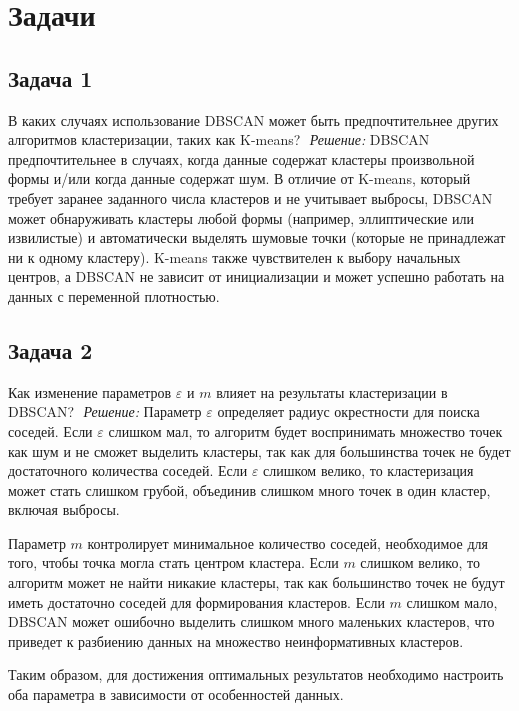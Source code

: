 \section*{Задачи}
\subsection*{Задача 1}
В каких случаях использование DBSCAN может быть предпочтительнее других алгоритмов кластеризации, таких как K-means?
\newline $ $ \newline
\textit{Решение:} DBSCAN предпочтительнее в случаях, когда данные содержат кластеры произвольной формы и/или когда данные содержат шум. В отличие от K-means, который требует заранее заданного числа кластеров и не учитывает выбросы, DBSCAN может обнаруживать кластеры любой формы (например, эллиптические или извилистые) и автоматически выделять шумовые точки (которые не принадлежат ни к одному кластеру). K-means также чувствителен к выбору начальных центров, а DBSCAN не зависит от инициализации и может успешно работать на данных с переменной плотностью.
\subsection*{Задача 2}
Как изменение параметров $\varepsilon$ и $m$ влияет на результаты кластеризации в DBSCAN?
\newline $ $ \newline
\textit{Решение:} Параметр $\varepsilon$ определяет радиус окрестности для поиска соседей. Если $\varepsilon$ слишком мал, то алгоритм будет воспринимать множество точек как шум и не сможет выделить кластеры, так как для большинства точек не будет достаточного количества соседей. Если $\varepsilon$ слишком велико, то кластеризация может стать слишком грубой, объединив слишком много точек в один кластер, включая выбросы.

Параметр $m$ контролирует минимальное количество соседей, необходимое для того, чтобы точка могла стать центром кластера. Если $m$ слишком велико, то алгоритм может не найти никакие кластеры, так как большинство точек не будут иметь достаточно соседей для формирования кластеров. Если $m$ слишком мало, DBSCAN может ошибочно выделить слишком много маленьких кластеров, что приведет к разбиению данных на множество неинформативных кластеров.

Таким образом, для достижения оптимальных результатов необходимо настроить оба параметра в зависимости от особенностей данных.

